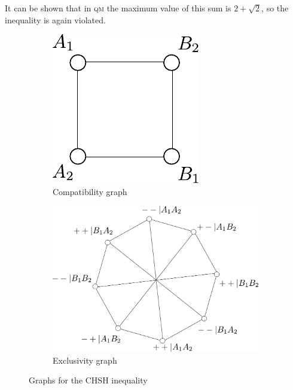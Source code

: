 \documentclass[a4paper]{article}
\newcommand{\acron}[1]{\textsc{#1}}
\newcommand{\QM}{\acron{qm}}
\theoremstyle{definition}
\begin{document}
It can be shown that in \QM{} the maximum value of this sum is $2+\sqrt{2}$, so
the inequality is again violated.
\begin{figure}[h]
    \begin{subfigure}{.3\textwidth}
        \centering
        \includegraphics[width=\textwidth]{CHSHog.pdf}
        \caption{Compatibility graph}
    \label{fig:CHSH_obs_graph}
    \end{subfigure}
    \begin{subfigure}{.7\textwidth}
        \centering
        \includegraphics[width=\textwidth]{CHSHpg.pdf}
        \caption{Exclusivity graph}
    \label{fig:CHSH_proj_graph}
    \end{subfigure}
    \caption{Graphs for the \acron{CHSH} inequality}
    \label{fig:CHSH_graphs}
\end{figure}
\end{document}
